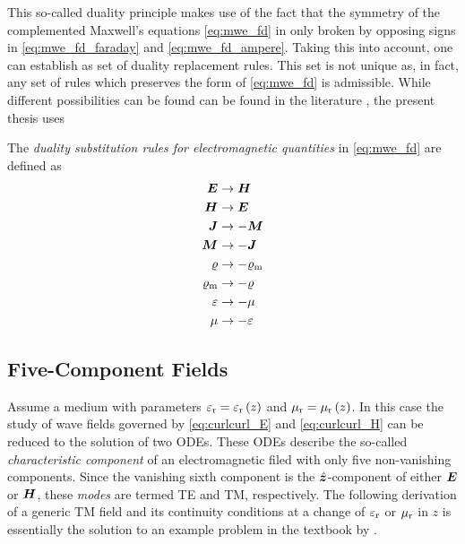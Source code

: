 This so-called duality principle makes use of the fact that the symmetry of the
complemented Maxwell's equations \eqref{eq:mwe_fd} in only broken by
opposing signs in \eqref{eq:mwe_fd_faraday} and \eqref{eq:mwe_fd_ampere}.
Taking this into account, one can establish as set of duality replacement rules.
This set is not unique as, in fact, any set of rules which preserves the form
of \eqref{eq:mwe_fd} is admissible.
While different possibilities can be found can be found in the literature
\cite{Jin2015,Harrington2001,Chew1999}, the present thesis uses
\begin{definition}
	The \emph{duality substitution rules for electromagnetic quantities} in
	\eqref{eq:mwe_fd} are defined as \cite[9]{Chew1999}
	\begin{subequations}
		\begin{align}
		\pvec{E} &\to \pvec{H} \\
		\pvec{H} &\to \pvec{E} \\
		\pvec{J} &\to -\pvec{M} \\
		\pvec{M} &\to -\pvec{J} \\
		\varrho &\to -\varrho_\mathrm{m} \\
		\varrho_\mathrm{m} &\to -\varrho \\
		\varepsilon &\to -\mu \\
		\mu &\to -\varepsilon 
		\end{align}
	\end{subequations}
\end{definition}











\subsection{Five-Component Fields}
\label{subsec:five_component_fields}

Assume a medium with parameters $\varepsilon_{\mathrm{r}} = \varepsilon_{\mathrm{r}}\left(z\right)$ and
$\mu_{\mathrm{r}} = \mu_{\mathrm{r}}\left(z\right)$.
In this case the study of wave fields governed by \eqref{eq:curlcurl_E} and
\eqref{eq:curlcurl_H} can be reduced to the solution of two \acsp{ODE}.
These \acsp{ODE} describe the so-called \emph{characteristic component} of an
electromagnetic filed with only five non-vanishing components.
Since the vanishing sixth component is the $\uv{z}$-component of either 
$\pvec{E}$ or $\pvec{H}$, these \emph{modes} are termed \ac{TE} and \ac{TM},
respectively.
The following derivation of a generic \ac{TM} field and its continuity
conditions at a change of $\varepsilon_{\mathrm{r}}$ or $\mu_{\mathrm{r}}$ in $z$ is essentially the solution
to an example problem in the textbook by \textcite[140]{Chew1999}.

